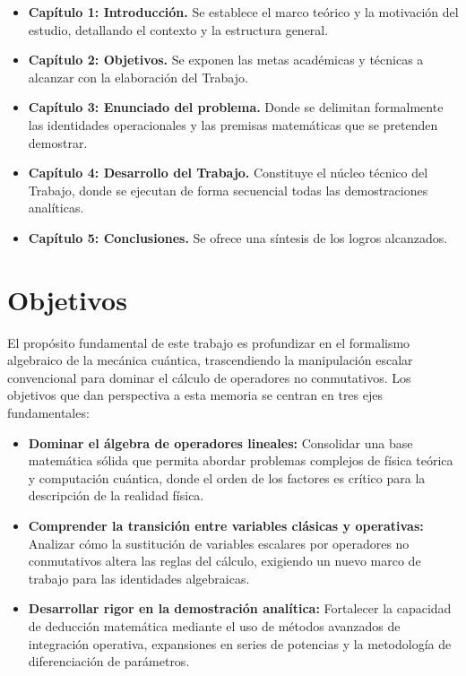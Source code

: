 \documentclass[11pt,a4paper,spanish]{book}
\begin{document}
\begin{itemize}
    \item \textbf{Capítulo 1: Introducción.} Se establece el marco teórico y la motivación del estudio, detallando el contexto y la estructura general.
    \item \textbf{Capítulo 2: Objetivos.} Se exponen las metas académicas y técnicas a alcanzar con la elaboración del Trabajo.
    \item \textbf{Capítulo 3: Enunciado del problema.} Donde se delimitan formalmente las identidades operacionales y las premisas matemáticas que se pretenden demostrar.
    \item \textbf{Capítulo 4: Desarrollo del Trabajo.} Constituye el núcleo técnico del Trabajo, donde se ejecutan de forma secuencial todas las demostraciones analíticas.
    \item \textbf{Capítulo 5: Conclusiones.} Se ofrece una síntesis de los logros alcanzados.
\end{itemize}

\chapter{Objetivos}

El propósito fundamental de este trabajo es profundizar en el formalismo algebraico de la mecánica cuántica, trascendiendo la manipulación escalar convencional para dominar el cálculo de operadores no conmutativos. Los objetivos que dan perspectiva a esta memoria se centran en tres ejes fundamentales:

\begin{itemize}
    \item \textbf{Dominar el álgebra de operadores lineales:} Consolidar una base matemática sólida que permita abordar problemas complejos de física teórica y computación cuántica, donde el orden de los factores es crítico para la descripción de la realidad física.
    \item \textbf{Comprender la transición entre variables clásicas y operativas:} Analizar cómo la sustitución de variables escalares por operadores no conmutativos altera las reglas del cálculo, exigiendo un nuevo marco de trabajo para las identidades algebraicas.
    \item \textbf{Desarrollar rigor en la demostración analítica:} Fortalecer la capacidad de deducción matemática mediante el uso de métodos avanzados de integración operativa, expansiones en series de potencias y la metodología de diferenciación de parámetros.
\end{itemize}
\end{document}
